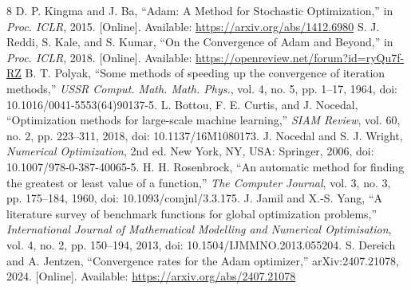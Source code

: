 ﻿\documentclass[conference]{IEEEtran}
\begin{document}
\begin{thebibliography}{8}
 D. P. Kingma and J. Ba, ``Adam: A Method for Stochastic Optimization,'' in \emph{Proc. ICLR}, 2015. [Online]. Available: \url{https://arxiv.org/abs/1412.6980}
 S. J. Reddi, S. Kale, and S. Kumar, ``On the Convergence of Adam and Beyond,'' in \emph{Proc. ICLR}, 2018. [Online]. Available: \url{https://openreview.net/forum?id=ryQu7f-RZ}
 B. T. Polyak, ``Some methods of speeding up the convergence of iteration methods,'' \emph{USSR Comput. Math. Math. Phys.}, vol. 4, no. 5, pp. 1--17, 1964, doi: 10.1016/0041-5553(64)90137-5.
 L. Bottou, F. E. Curtis, and J. Nocedal, ``Optimization methods for large-scale machine learning,'' \emph{SIAM Review}, vol. 60, no. 2, pp. 223--311, 2018, doi: 10.1137/16M1080173.
 J. Nocedal and S. J. Wright, \emph{Numerical Optimization}, 2nd ed. New York, NY, USA: Springer, 2006, doi: 10.1007/978-0-387-40065-5.
 H. H. Rosenbrock, ``An automatic method for finding the greatest or least value of a function,'' \emph{The Computer Journal}, vol. 3, no. 3, pp. 175--184, 1960, doi: 10.1093/comjnl/3.3.175.
 J. Jamil and X.-S. Yang, ``A literature survey of benchmark functions for global optimization problems,'' \emph{International Journal of Mathematical Modelling and Numerical Optimisation}, vol. 4, no. 2, pp. 150--194, 2013, doi: 10.1504/IJMMNO.2013.055204.
 S. Dereich and A. Jentzen, ``Convergence rates for the Adam optimizer,'' arXiv:2407.21078, 2024. [Online]. Available: \url{https://arxiv.org/abs/2407.21078}
\end{thebibliography}
\end{document}
